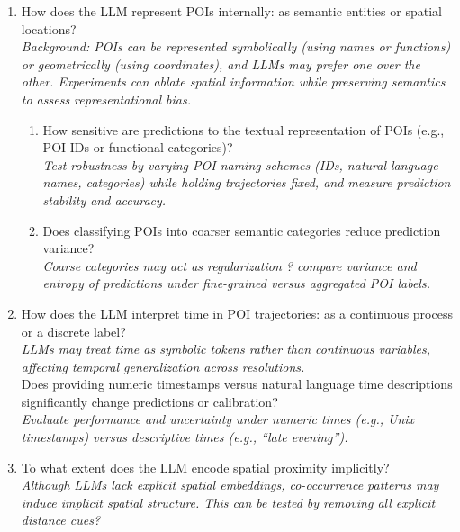 \documentclass{article}
\begin{document}
\begin{enumerate}
    \item How does the LLM represent POIs internally: as semantic entities or spatial locations?\\
    \textit{Background: POIs can be represented symbolically (using names or functions) or geometrically (using coordinates), 
    and LLMs may prefer one over the other. Experiments can ablate spatial information while preserving semantics to assess representational bias.}
    \begin{enumerate}
        \item How sensitive are predictions to the textual representation of POIs (e.g., POI IDs or functional categories)?\\
        \textit{Test robustness by varying POI naming schemes 
        (IDs, natural language names, categories) while holding trajectories fixed, 
        and measure prediction stability and accuracy.}
        \item Does classifying POIs into coarser semantic categories reduce prediction variance?\\
        \textit{Coarse categories may act as regularization ? compare variance and entropy of predictions under fine-grained versus aggregated POI labels.}
        
    \end{enumerate}

    
    \item How does the LLM interpret time in POI trajectories: 
    as a continuous process or 
    a discrete label?\\
    \textit{LLMs may treat time as symbolic tokens rather than continuous variables, affecting temporal generalization across resolutions.} \\
    Does providing numeric timestamps versus natural language time descriptions significantly change predictions or calibration?\\
    \textit{Evaluate performance and uncertainty under numeric times (e.g., Unix timestamps) versus descriptive times (e.g., ``late evening'').}
    
    \item To what extent does the LLM encode spatial proximity implicitly?\\
    
    \textit{Although LLMs lack explicit spatial embeddings, 
    co-occurrence patterns may induce implicit spatial structure. 
    This can be tested by removing all explicit distance cues? }
    

\end{enumerate}
\end{document}
